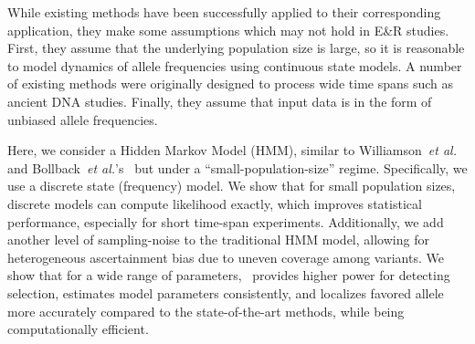 While existing methods have been successfully applied to their
corresponding application, they make some assumptions which may not
hold in E\&R studies.  First, they assume that the underlying
population size is large, so it is reasonable to model dynamics of allele 
frequencies using continuous state models.  A number of existing methods 
were originally
designed to process wide time spans such as ancient DNA
studies. Finally, they assume that input data is in the form of
unbiased allele frequencies.

Here, we consider a Hidden Markov Model (HMM), similar to Williamson~\emph{et
  al.}~\cite{williamson1999using} and Bollback~\emph{et
  al.}'s~\cite{bollback2008estimation} but under a
``small-population-size'' regime. Specifically, we use a discrete
state (frequency) model.  We show that for small population sizes,
discrete models can compute likelihood exactly, which improves
statistical performance, especially for short time-span
experiments. Additionally, we add another level of sampling-noise to
the traditional HMM model, allowing for heterogeneous ascertainment
bias due to uneven coverage among variants. We show that for a wide
range of parameters,  \comale\ provides higher power for
detecting selection, estimates model parameters consistently, and localizes
favored allele more accurately compared to the state-of-the-art
methods, while being computationally efficient.

